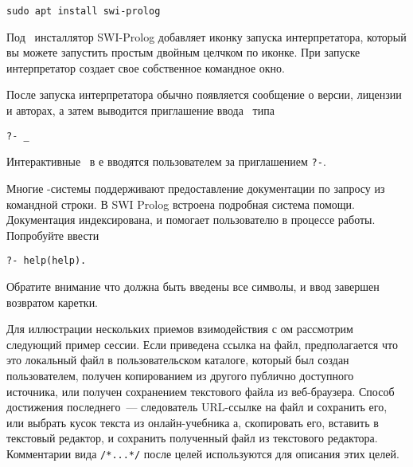 \begin{verbatim}
sudo apt install swi-prolog
\end{verbatim}

\bigskip
Под \win\ инсталлятор SWI-Prolog добавляет иконку запуска
интерпретатора, который вы можете запустить простым двойным целчком по
иконке. При запуске интерпретатор создает свое собственное командное окно.
\bigskip

После запуска интерпретатора обычно появляется сообщение о версии, лицензии и
авторах, а затем выводится приглашение ввода \ типа

\begin{verbatim}
?- _
\end{verbatim}

Интерактивные \ в \prolog е вводятся пользователем за приглашением
\verb|?-|.

Многие \prolog-системы поддерживают предоставление документации по запросу из
командной строки. В SWI Prolog встроена подробная система помощи. Документация
индексирована, и помогает пользователю в процессе работы. Попробуйте ввести

\begin{verbatim}
?- help(help).
\end{verbatim}

Обратите внимание что должна быть введены все символы, и ввод завершен возвратом
каретки.

Для иллюстрации нескольких приемов взимодействия с \prolog ом рассмотрим
следующий пример сессии. Если приведена ссылка на файл, предполагается что это
локальный файл в пользовательском каталоге, который был создан пользователем,
получен копированием из другого публично доступного источника, или получен
сохранением текстового файла из веб-браузера. Способ достижения последнего\ ---
следователь URL-ссылке на файл и сохранить его, или выбрать кусок текста из
онлайн-учебника \prolog а, скопировать его, вставить в текстовый редактор, и
сохранить полученный файл из текстового редактора. Комментарии вида
\verb|/*...*/| после целей используются для описания этих целей.

